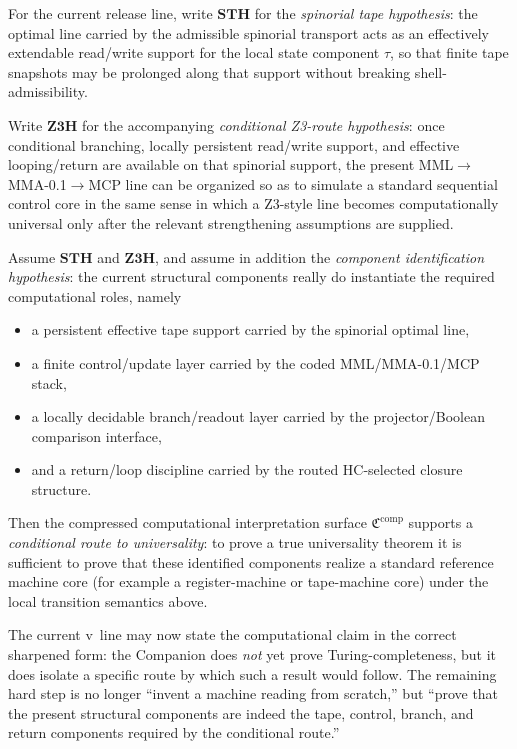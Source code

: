 \begin{definition}
For the current release line, write $\mathbf{STH}$ for the \emph{spinorial tape hypothesis}: the optimal line carried by the admissible spinorial transport acts as an effectively extendable read/write support for the local state component $\tau$, so that finite tape snapshots may be prolonged along that support without breaking shell-admissibility.

Write $\mathbf{Z3H}$ for the accompanying \emph{conditional Z3-route hypothesis}: once conditional branching, locally persistent read/write support, and effective looping/return are available on that spinorial support, the present MML$\to$MMA-0.1$\to$MCP line can be organized so as to simulate a standard sequential control core in the same sense in which a Z3-style line becomes computationally universal only after the relevant strengthening assumptions are supplied.
\end{definition}

\begin{proposition}
Assume $\mathbf{STH}$ and $\mathbf{Z3H}$, and assume in addition the \emph{component identification hypothesis}: the current structural components really do instantiate the required computational roles, namely
\begin{itemize}[leftmargin=2em]
  \item a persistent effective tape support carried by the spinorial optimal line,
  \item a finite control/update layer carried by the coded MML/MMA-0.1/MCP stack,
  \item a locally decidable branch/readout layer carried by the projector/Boolean comparison interface,
  \item and a return/loop discipline carried by the routed HC-selected closure structure.
\end{itemize}
Then the compressed computational interpretation surface $\mathfrak C^{\mathrm{comp}}$ supports a \emph{conditional route to universality}: to prove a true universality theorem it is sufficient to prove that these identified components realize a standard reference machine core (for example a register-machine or tape-machine core) under the local transition semantics above.
\end{proposition}

\begin{corollary}
The current v\docversion\ line may now state the computational claim in the correct sharpened form: the Companion does \emph{not} yet prove Turing-completeness, but it does isolate a specific route by which such a result would follow. The remaining hard step is no longer ``invent a machine reading from scratch,'' but ``prove that the present structural components are indeed the tape, control, branch, and return components required by the conditional route.''
\end{corollary}


